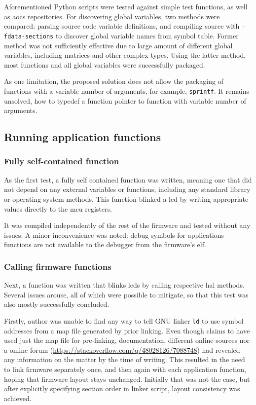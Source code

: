 Aforementioned Python scripts were tested against simple test functions, as well as \gls{aocs} repositories. For discovering global variables, two methods were compared: parsing source code variable definitions, and compiling source with \texttt{-fdata-sections} to discover global variable names from symbol table. Former method was not sufficiently effective due to large amount of different global variables, including matrices and other complex types. Using the latter method, most functions and all global variables were successfully packaged.

As one limitation, the proposed solution does not allow the packaging of functions with a variable number of arguments, for example, \texttt{sprintf}. It remains unsolved, how to typedef a function pointer to function with variable number of arguments.

\subsection{Running application functions}

\subsubsection{Fully self-contained function}

As the first test, a fully self contained function was written, meaning one that did not depend on any external variables or functions, including any standard library or operating system methods. This function blinked a \gls{led} by writing appropriate values directly to the \gls{mcu} registers.

It was compiled independently of the rest of the firmware and tested without any issues. A minor inconvenience was noted: debug symbols for applications functions are not available to the debugger from the firmware's \gls{elf}.

\subsubsection{Calling firmware functions}

Next, a function was written that blinks \glspl{led} by calling respective \gls{hal} methods. Several issues arouse, all of which were possible to mitigate, so that this test was also mostly successfully concluded.

Firstly, author was unable to find any way to tell GNU linker \texttt{ld} to use symbol addresses from a map file generated by prior linking. Even though \textcite{Dunkels2006} claims to have used just the map file for pre-linking, documentation, different online sources nor a online forum (\url{https://stackoverflow.com/q/48028126/7088748}) had revealed any information on the matter by the time of writing. This resulted in the need to link firmware separately once, and then again with each application function, hoping that firmware layout stays unchanged. Initially that was not the case, but after explicitly specifying section order in linker script, layout consistency was achieved.

